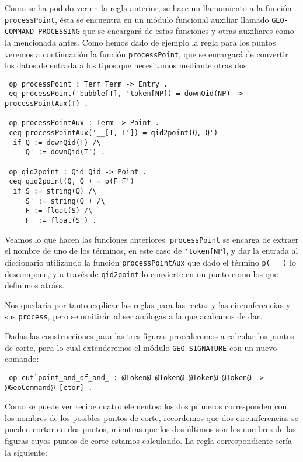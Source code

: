 Como se ha podido ver en la regla anterior, se hace un llamamiento a la función  \verb"processPoint", ésta se encuentra en un módulo funcional auxiliar llamado \verb"GEO-COMMAND-PROCESSING" que se encargará de estas funciones y otras auxiliares como la mencionada antes. Como hemos dado de ejemplo la regla para los puntos veremos a continuación la función \verb"processPoint", que se encargará de convertir los datos de entrada a los tipos que necesitamos mediante otras dos:

{\codesize
\begin{verbatim}
 op processPoint : Term Term -> Entry .
 eq processPoint('bubble[T], 'token[NP]) = downQid(NP) -> processPointAux(T) .

 op processPointAux : Term -> Point .
 ceq processPointAux('__[T, T']) = qid2point(Q, Q')
  if Q := downQid(T) /\
     Q' := downQid(T') .

 op qid2point : Qid Qid -> Point .
 ceq qid2point(Q, Q') = p(F F')
  if S := string(Q) /\
     S' := string(Q') /\
     F := float(S) /\
     F' := float(S') .
\end{verbatim}
}

Veamos lo que hacen las funciones anteriores. \texttt{processPoint} se encarga de extraer el nombre de uno de los términos, en este caso de \verb"'token[NP]", y dar la entrada al diccionario utilizando la función \texttt{processPointAux} que dado el término \verb"p(_ _)" lo descompone, y a través de \texttt{qid2point} lo convierte en un punto como los que definimos atráss. \par

Nos quedaría por tanto explicar las reglas para las rectas y las circunferencias y sus \verb"process", pero se omitirán al ser análogas a la que acabamos de dar.\par

Dadas las construcciones para las tres figuras procederemos a calcular los puntos de corte, para lo cual extenderemos el módulo \verb"GEO-SIGNATURE" con un nuevo comando:
{\codesize
\begin{verbatim}
 op cut`point_and_of_and_ : @Token@ @Token@ @Token@ @Token@ -> @GeoCommand@ [ctor] .
\end{verbatim}
}

Como se puede ver recibe cuatro elementos: los dos primeros corresponden con los nombres de los posibles puntos de corte, recordemos que dos circunferencias se pueden cortar en dos puntos, mientras que los dos últimos son los nombres de las figuras cuyos puntos de corte estamos calculando. La regla correspondiente sería la siguiente: \par
 
